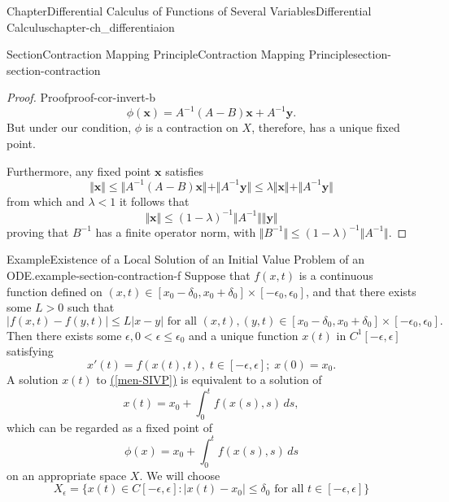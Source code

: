 \documentclass[oneside,10pt,]{book}
\newcommand{\xreffont}{\relax}
\numberwithin{equation}{section}
\newcommand{\bx}{\mathbf{x}}
\newcommand{\by}{\mathbf{y}}
\newcommand{\lt}{<}
\newcommand{\gt}{>}
\begin{document}
\begin{chapterptx}{Chapter}{Differential Calculus of Functions of Several Variables}{}{Differential Calculus}{}{}{chapter-ch_differentiaion}
\begin{sectionptx}{Section}{Contraction Mapping Principle}{}{Contraction Mapping Principle}{}{}{section-section-contraction}
\begin{proof}{Proof}{}{proof-cor-invert-b}
\begin{equation*}
\phi(\bx)= A^{-1}(A-B)\bx + A^{-1}\by.
\end{equation*}
But under our condition, \(\phi\) is a contraction on \(X\), therefore, has a unique fixed point.%
\par
Furthermore, any fixed point \(\bx\) satisfies%
\begin{equation*}
\Vert \bx \Vert \le \Vert A^{-1}(A-B)\bx \Vert + \Vert A^{-1}\by\Vert
\le \lambda \Vert \bx \Vert + \Vert A^{-1}\by\Vert
\end{equation*}
from which and \(\lambda \lt 1\) it follows that%
\begin{equation*}
\Vert \bx \Vert \le (1-\lambda)^{-1} \Vert A^{-1}\Vert \Vert\by\Vert
\end{equation*}
proving that \(B^{-1}\) has a finite operator norm, with \(\Vert B^{-1}\Vert \le (1-\lambda)^{-1} \Vert A^{-1}\Vert\).%
\end{proof}
\begin{example}{Example}{Existence of a Local Solution of an Initial Value Problem of an ODE.}{example-section-contraction-f}%
 Suppose that \(f(x, t)\) is a continuous function defined on \((x, t)\in [x_{0}-\delta_{0}, x_{0}+\delta_{0}]\times [-\epsilon_{0}, \epsilon_{0}]\), and that there exists some \(L\gt 0\) such that%
\begin{equation*}
\vert f(x, t) -f(y, t)\vert \le L |x-y| \text{ for all 
$(x, t), (y, t)\in [x_{0}-\delta_{0}, x_{0}+\delta_{0}]\times [-\epsilon_{0}, \epsilon_{0}]$.}
\end{equation*}
Then there exists some \(\epsilon, 0 \lt \epsilon \le \epsilon_{0}\) and a unique function \(x(t)\) in \(C^{1}[ -\epsilon, \epsilon]\) satisfying%
\begin{equation}
x'(t)=f(x(t), t), \; t\in [ -\epsilon, \epsilon]; \; x(0)=x_{0}.\label{men-SIVP}
\end{equation}
A solution \(x(t)\) to \hyperref[men-SIVP]{({\xreffont\ref{men-SIVP}})} is equivalent to a solution of%
\begin{equation*}
x(t) =x_{0} +\int_{0}^{t} f(x(s), s)\, ds,
\end{equation*}
which can be regarded as a fixed point of%
\begin{equation*}
\phi (x)= x_{0} +\int_{0}^{t} f(x(s), s)\, ds
\end{equation*}
on an appropriate space \(X\). We will choose%
\begin{equation*}
X_{\epsilon}=\{x(t)\in C[ -\epsilon, \epsilon]:
|x(t)-x_{0}|\le \delta_{0} \text{ for all $t\in [ -\epsilon, \epsilon]$} \}
\end{equation*}

\end{example}
\end{sectionptx}
\end{chapterptx}
\end{document}
